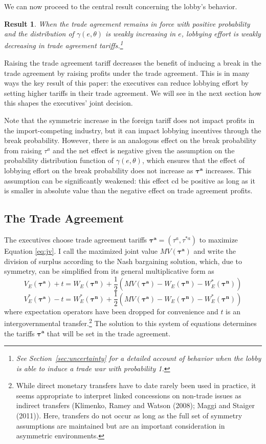 \documentclass[10pt]{article}
\newtheorem{result}{Result}
\newcommand{\ta}{\theta}
\newcommand{\bta}{\bm{\tau^a}}
\newcommand{\btn}{\bm{\tau^n}}
\newcommand{\ga}{\gamma}
\begin{document}
We can now proceed to the central result concerning the lobby's behavior. 
\begin{result}
  When the trade agreement remains in force with positive probability and the distribution of $\ga(e,\ta)$ is weakly increasing in $e$, lobbying effort is weakly decreasing in trade agreement tariffs.\footnote{See Section~\ref{sec:uncertainty} for a detailed account of behavior when the lobby is able to induce a trade war with probability 1.}
  \label{res:lobby}
\end{result}

\noindent Raising the trade agreement tariff decreases the benefit of inducing a break in the trade agreement by raising profits under the trade agreement. This is in many ways the key result of this paper: the executives can reduce lobbying effort by setting higher tariffs in their trade agreement. We will see in the next section how this shapes the executives' joint decision. 

Note that the symmetric increase in the foreign tariff does not impact profits in the import-competing industry, but it can impact lobbying incentives through the break probability. However, there is an analogous effect on the break probability from raising $\tau^a$ and the net effect is negative given the assumption on the probability distribution function of $\ga(e,\ta)$, which ensures that the effect of lobbying effort on the break probability does not increase as $\bta$ increases. This assumption can be significantly weakened: this effect cd be positive as long as it is smaller in absolute value than the negative effect on trade agreement profits.



\subsection{The Trade Agreement}
\label{sec:ta}
The executives choose trade agreement tariffs $\bta=\left(\tau^a,\tau^{*a} \right)$ to maximize Equation \ref{eq:jv}. I call the maximized joint value $MV(\bta)$ and write the division of surplus according to the Nash bargaining solution, which, due to symmetry, can be simplified from its general multiplicative form as
\[
  V_E(\bta) + t = W_E(\btn) + \frac{1}{2} \left( MV(\bta) - W_E(\btn) - W_E^*(\btn) \right)
\]
\[
  V_E^*(\bta) - t = W_E^*(\btn) + \frac{1}{2} \left( MV(\bta) - W_E(\btn) - W_E^*(\btn) \right)
\]
where expectation operators have been dropped for convenience and $t$ is an intergovernmental transfer.\footnote{While direct monetary transfers have to date rarely been used in practice, it seems appropriate to interpret linked concessions on non-trade issues as indirect transfers (Klimenko, Ramey and Watson (2008); Maggi and Staiger (2011)). Here, transfers do not occur as long as the full set of symmetry assumptions are maintained but are an important consideration in asymmetric environments.} The solution to this system of equations determines the tariffs $\bta$ that will be set in the trade agreement.
\end{document}
